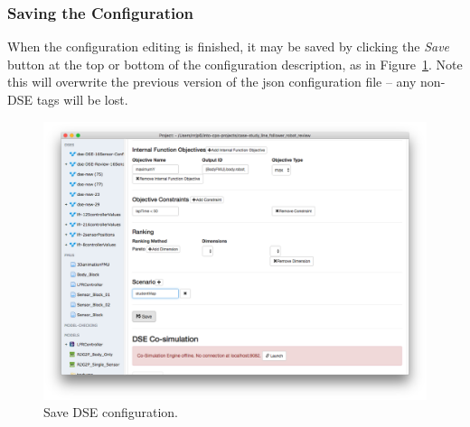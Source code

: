 \subsubsection{Saving the Configuration}\label{sec:dse:app:save}

When the configuration editing is finished, it may be saved by clicking the \textit{Save} button at the top or bottom of the configuration description, as in Figure~\ref{fig:dse:edit:app-save}. Note this will overwrite the previous version of the json configuration file -- any non-DSE tags will be lost.

\begin{figure}[ht]
	\centering
	\includegraphics[width=\textwidth]{figures/dse/app-save}
	\caption{Save DSE configuration.}\label{fig:dse:edit:app-save}
\end{figure}
%
%
%
